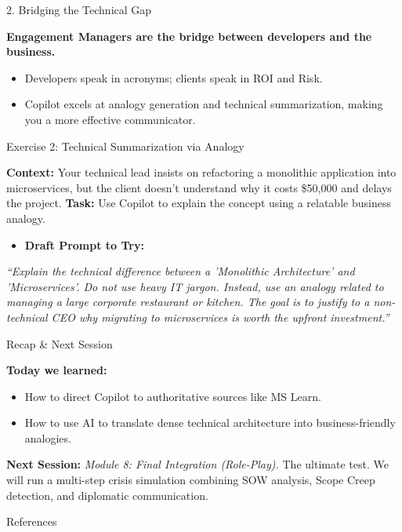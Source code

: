 \documentclass[aspectratio=169]{beamer}
\begin{document}
\begin{frame}[fragile]{2. Bridging the Technical Gap}


\textbf{Engagement Managers are the bridge between developers and the business.}

\begin{itemize}
  \item Developers speak in acronyms; clients speak in ROI and Risk.
  \item Copilot excels at analogy generation and technical summarization, making you a more effective communicator.
\end{itemize}
\end{frame}



\begin{frame}[fragile]{Exercise 2: Technical Summarization via Analogy}


\textbf{Context:} Your technical lead insists on refactoring a monolithic application into microservices, but the client doesn't understand why it costs \$50,000 and delays the project.
\textbf{Task:} Use Copilot to explain the concept using a relatable business analogy.

\begin{itemize}
  \item \textbf{Draft Prompt to Try:}
\end{itemize}
\textit{``Explain the technical difference between a 'Monolithic Architecture' and 'Microservices'. Do not use heavy IT jargon. Instead, use an analogy related to managing a large corporate restaurant or kitchen. The goal is to justify to a non-technical CEO why migrating to microservices is worth the upfront investment.''}

\end{frame}



\begin{frame}[fragile]{Recap \& Next Session}


\textbf{Today we learned:}
\begin{itemize}
  \item How to direct Copilot to authoritative sources like MS Learn.
  \item How to use AI to translate dense technical architecture into business-friendly analogies.
\end{itemize}
\textbf{Next Session:}
\textit{Module 8: Final Integration (Role-Play).} The ultimate test. We will run a multi-step crisis simulation combining SOW analysis, Scope Creep detection, and diplomatic communication.
\end{frame}




\begin{frame}[allowframebreaks]{References}
  
  
\end{frame}
\end{document}
